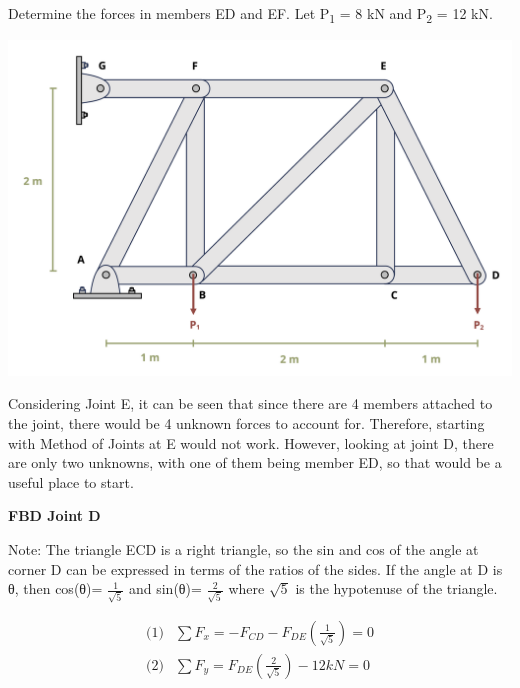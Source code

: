 \documentclass[
  letterpaper,
  DIV=11,
  numbers=noendperiod]{scrreprt}
\begin{document}
\begin{tcolorbox}[enhanced jigsaw, colback=white, colframe=quarto-callout-note-color-frame, leftrule=.75mm, opacitybacktitle=0.6, colbacktitle=quarto-callout-note-color!10!white, arc=.35mm, bottomrule=.15mm, breakable, title={Example 1.4}, left=2mm, titlerule=0mm, toptitle=1mm, toprule=.15mm, opacityback=0, rightrule=.15mm, coltitle=black, bottomtitle=1mm]

Determine the forces in members ED and EF. Let P\textsubscript{1} = 8 kN
and P\textsubscript{2} = 12 kN.

\begin{center}
\includegraphics{images/CH1 PNGs/example 1.4 part 1.png}
\end{center}

Considering Joint E, it can be seen that since there are 4 members
attached to the joint, there would be 4 unknown forces to account for.
Therefore, starting with Method of Joints at E would not work. However,
looking at joint D, there are only two unknowns, with one of them being
member ED, so that would be a useful place to start.

\textbf{FBD Joint D}

Note: The triangle ECD is a right triangle, so the sin and cos of the
angle at corner D can be expressed in terms of the ratios of the sides.
If the angle at D is θ, then cos(θ)= \(\frac{1}{\sqrt{5}}\) and sin(θ)=
\(\frac{2}{\sqrt{5}}\) where \(\sqrt{5}\) is the hypotenuse of the
triangle.

\[
\begin{aligned}
\text{(1)} & \sum F_x=-F_{C D}-F_{D E}\left(\frac{1}{\sqrt{5}}\right)=0 \\
\text{(2)} & \sum F_y=F_{D E}\left(\frac{2}{\sqrt{5}}\right)-12 k N=0
\end{aligned}
\]


\end{tcolorbox}
\end{document}

